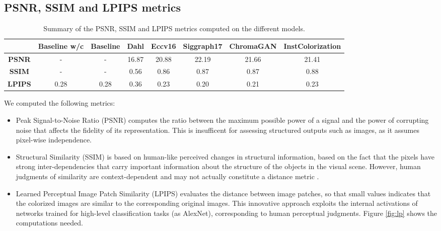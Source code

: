 \subsection{PSNR, SSIM and LPIPS metrics}

\begin{table*}[ht]
	\begin{center}
		\begin{tabular}{c|ccccccc}
			& \textbf{Baseline w/c}&\textbf{Baseline} & \textbf{Dahl} & \textbf{Eccv16} & \textbf{Siggraph17} & \textbf{ChromaGAN} & \textbf{InstColorization}  \\
			\midrule
			\textbf{PSNR} & - & - & 16.87 & 20.88 & 22.19 & 21.66 & 21.41 \\
			\midrule
			\textbf{SSIM} & - & - & 0.56 & 0.86 & 0.87 & 0.87 & 0.88 \\
			\midrule
			\textbf{LPIPS} & 0.28 & 0.28 & 0.36 & 0.23 & 0.20 & 0.21 & 0.23 \\
		\end{tabular}
	\end{center}
	\caption{{\small  Summary of the PSNR, SSIM and LPIPS metrics computed on the different models.}}
	\label{tab:metrics}
\end{table*}

We computed the following metrics:
\begin{itemize}
	\item Peak Signal-to-Noise Ratio (PSNR) \cite{psnr-ssim} computes the ratio between the maximum possible power of a signal and the power of corrupting noise that affects the fidelity of its representation. This is insufficent for assessing structured outputs such as images, as it assumes pixel-wise independence.
	
	\item Structural Similarity (SSIM) \cite{psnr-ssim} is based on human-like perceived changes in structural information, based on the fact that the pixels have strong inter-dependencies that carry important information about the structure of the objects in the visual scene. However, human judgments of similarity are context-dependent and may not actually constitute a distance metric \cite{met}.

	\item Learned Perceptual Image Patch Similarity (LPIPS) \cite{lpips} evaluates the distance between image patches, so that small values indicates that the colorized images are similar to the corresponding original images. This innovative approach exploits the internal activations of networks trained for high-level classification tasks (as AlexNet), corresponding to human perceptual judgments. Figure \ref{fig:lp} shows the computations needed.

\end{itemize}

